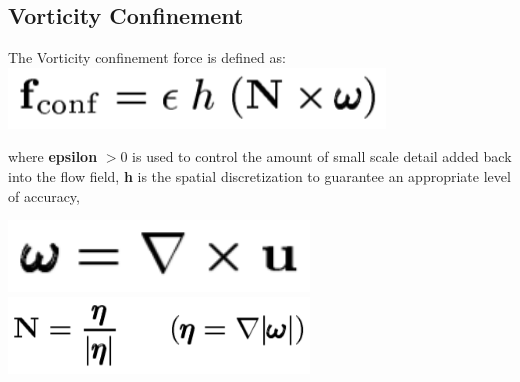 \documentclass[11pt,letterpaper]{article}
\begin{document}
\subsection{Vorticity Confinement}

The Vorticity confinement force is defined as: \newline
\includegraphics[width=10cm]{vorticityConfinementForce.png} \newline

where \textbf{epsilon} $>0$ is used to control the amount of small scale detail added back into the flow field, \newline
\textbf{h} is the spatial discretization to guarantee an appropriate level of accuracy, \newline

\includegraphics[width=8cm]{vorticity.png} \newline
\includegraphics[width=8cm]{gradient.png} \newline
	
\end{document}
